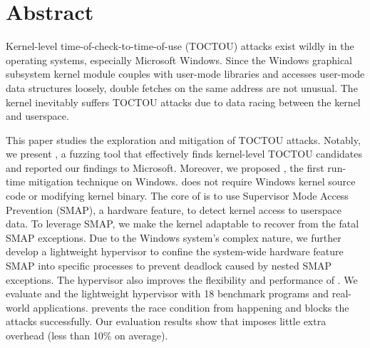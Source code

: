 \section{Abstract}

Kernel-level time-of-check-to-time-of-use (TOCTOU) attacks exist wildly in the operating systems, especially Microsoft Windows. Since the Windows graphical subsystem kernel module couples with user-mode libraries and accesses user-mode data structures loosely, double fetches on the same address are not unusual. The kernel inevitably suffers TOCTOU attacks due to data racing between the kernel and userspace.

This paper studies the exploration and mitigation of TOCTOU attacks. Notably, we present \toolname, a fuzzing tool that effectively finds kernel-level TOCTOU candidates and reported our findings to Microsoft. Moreover, we proposed \name, the first run-time mitigation technique on Windows. \name does not require Windows kernel source code or modifying kernel binary. The core of \name is to use Supervisor Mode Access Prevention (SMAP), a hardware feature, to detect kernel access to userspace data. To leverage SMAP, we make the kernel adaptable to recover from the fatal SMAP exceptions. Due to the Windows system's complex nature, we further develop a lightweight hypervisor to confine the system-wide hardware feature SMAP into specific processes to prevent deadlock caused by nested SMAP exceptions. The hypervisor also improves the flexibility and performance of \name. We evaluate \name and the lightweight hypervisor with 18 benchmark programs and real-world applications. \name prevents the race condition from happening and blocks the attacks successfully. Our evaluation results show that \name imposes little extra overhead (less than 10\% on average).

